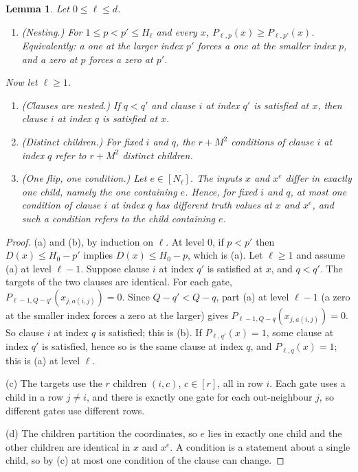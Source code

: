 \documentclass[11pt]{article}
\newtheorem{lemma}[theorem]{Lemma}
\theoremstyle{definition}
\theoremstyle{remark}
\begin{document}
\begin{lemma}\label{lem:structure}
Let \(0\le\ell\le d\).
\begin{enumerate}[label=\textup{(\alph*)},leftmargin=2.2em]
\item \textup{(Nesting.)} For \(1\le p<p'\le H_\ell\) and every \(x\),
\(P_{\ell,p}(x)\ge P_{\ell,p'}(x)\). Equivalently: a one at the larger index
\(p'\) forces a one at the smaller index \(p\), and a zero at \(p\) forces a
zero at \(p'\).
\end{enumerate}
Now let \(\ell\ge1\).
\begin{enumerate}[label=\textup{(\alph*)},leftmargin=2.2em,resume]
\item \textup{(Clauses are nested.)} If \(q<q'\) and clause \(i\) at index
\(q'\) is satisfied at \(x\), then clause \(i\) at index \(q\) is satisfied at
\(x\).
\item \textup{(Distinct children.)} For fixed \(i\) and \(q\), the \(r+M^2\)
conditions of clause \(i\) at index \(q\) refer to \(r+M^2\) distinct children.
\item \textup{(One flip, one condition.)} Let \(e\in[N_\ell]\). The inputs
\(x\) and \(x^e\) differ in exactly one child, namely the one containing \(e\).
Hence, for fixed \(i\) and \(q\), at most one condition of clause \(i\) at
index \(q\) has different truth values at \(x\) and \(x^e\), and such a
condition refers to the child containing \(e\).
\end{enumerate}
\end{lemma}
\begin{proof}
(a) and (b), by induction on \(\ell\). At level \(0\), if \(p<p'\) then
\(D(x)\le H_0-p'\) implies \(D(x)\le H_0-p\), which is (a).
Let \(\ell\ge1\) and assume (a) at level \(\ell-1\). Suppose clause \(i\) at
index \(q'\) is satisfied at \(x\), and \(q<q'\). The targets of the two
clauses are identical. For each gate,
\(P_{\ell-1,Q-q'}(x_{j,a(i,j)})=0\). Since \(Q-q'<Q-q\), part (a) at level
\(\ell-1\) (a zero at the smaller index forces a zero at the larger) gives
\(P_{\ell-1,Q-q}(x_{j,a(i,j)})=0\). So clause \(i\) at index \(q\) is
satisfied; this is (b). If \(P_{\ell,q'}(x)=1\), some clause at index \(q'\)
is satisfied, hence so is the same clause at index \(q\), and
\(P_{\ell,q}(x)=1\); this is (a) at level \(\ell\).

(c) The targets use the \(r\) children \((i,c)\), \(c\in[r]\), all in row
\(i\). Each gate uses a child in a row \(j\ne i\), and there is exactly one
gate for each out-neighbour \(j\), so different gates use different rows.

(d) The children partition the coordinates, so \(e\) lies in exactly one child
and the other children are identical in \(x\) and \(x^e\). A condition is a
statement about a single child, so by (c) at most one condition of the clause
can change.
\end{proof}
\end{document}

